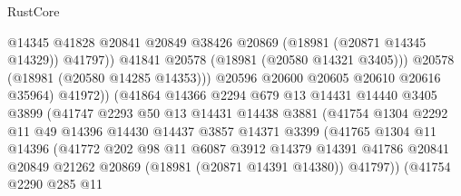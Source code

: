 \begin{lexlean}{RustCore}
\begin{coremodule}
                                    @14345
                                    @41828
                                    @20841
                                    @20849
                                    @38426
                                    @20869
                                    (@18981 (@20871 @14345 @14329))
                                    @41797))
                                @41841
                                @20578
                                (@18981 (@20580 @14321 @3405)))
                              @20578
                              (@18981 (@20580 @14285 @14353)))
                            @20596
                            @20600
                            @20605
                            @20610
                            @20616
                            @35964)
                          @41972))
                      (@41864
                        @14366
                        @2294
                        @679
                        @13
                        @14431
                        @14440
                        @3405
                        @3899
                        (@41747
                          @2293
                          @50
                          @13
                          @14431
                          @14438
                          @3881
                          (@41754
                            @1304
                            @2292
                            @11
                            @49
                            @14396
                            @14430
                            @14437
                            @3857
                            @14371
                            @3399
                            (@41765
                              @1304
                              @11
                              @14396
                              (@41772
                                @202
                                @98
                                @11
                                @6087
                                @3912
                                @14379
                                @14391
                                @41786
                                @20841
                                @20849
                                @21262
                                @20869
                                (@18981 (@20871 @14391 @14380))
                                @41797))
                            (@41754
                              @2290
                              @285
                              @11

\end{coremodule}
\end{lexlean}
